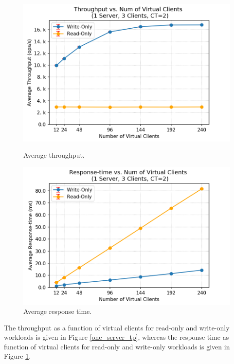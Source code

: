 \begin{figure}[H]
   \begin{minipage}{0.48\textwidth}
     \centering
     \includegraphics[width=1\linewidth]{figures/1_BaselineWithoutMW/one_server/one_server_mem_tp_2018-10-21_20h12.png}
     \caption{Average throughput.}\label{one_server_tp}
   \end{minipage}\hfill
   \begin{minipage}{0.48\textwidth}
     \centering
     \includegraphics[width=1\linewidth]{figures/1_BaselineWithoutMW/one_server/one_server_mem_rt_2018-10-21_20h12.png}
     \caption{Average response time.}\label{one_server_rt}
   \end{minipage}
\end{figure}
The throughput as a function of virtual clients for read-only and write-only workloads is given in Figure \ref{one_server_tp}, whereas the response time as function of virtual clients for read-only and write-only workloads is given in Figure \ref{one_server_rt}. 

